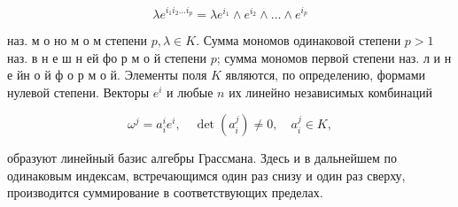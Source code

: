 \documentclass[10pt]{article}
\begin{document}
\[

\lambda e^{i_{1} i_{2} \ldots i_{p}}=\lambda e^{i_{1}} \wedge e^{i_{2}} \wedge \ldots \wedge e^{i_{p}}

\]



наз. м о но м о м степени $p, \lambda \in K$. Сумма мономов одинаковой степени $p>1$ наз. в н е ш н ей фо р м о й степени $p$; сумма мономов первой степени наз. л и н е йн о й ф о р м о й. Элементы поля $K$ являются, по определению, формами нулевой степени. Векторы $e^{i}$ и любые $n$ их линейно независимых комбинаций



\[

\omega^{j}=a_{i}^{i} e^{i}, \quad \operatorname{det}\left(a_{i}^{j}\right) \neq 0, \quad a_{i}^{j} \in K,

\]



образуют линейный базис алгебры Грассмана. Здесь и в дальнейшем по одинаковым индексам, встречающимся один раз снизу и один раз сверху, производится суммирование в соответствующих пределах.
\end{document}

